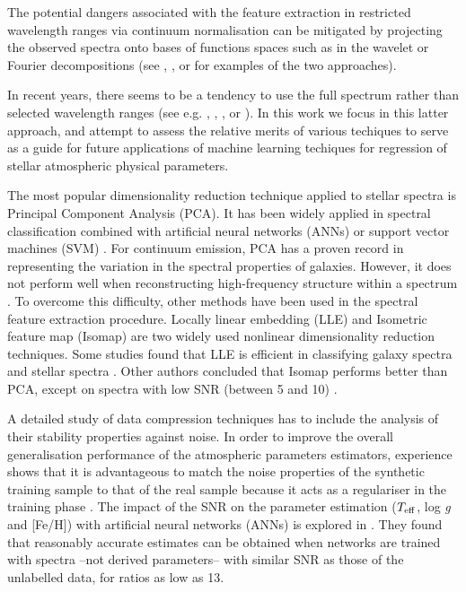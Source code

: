 \documentclass[a4paper,fleqn,usenatbib]{mnras}
\begin{document}
The potential dangers associated with the feature extraction in
restricted wavelength ranges via continuum normalisation can be
mitigated by projecting the observed spectra onto bases of functions
spaces such as in the wavelet or Fourier decompositions (see
\cite{2010PASP..122..608M}, \cite{2015MNRAS.452.1394L}, or
\cite{2015ApJS..218....3L} for examples of the two approaches).

In recent years, there seems to be a tendency to use the full spectrum
rather than selected wavelength ranges (see
e.g. \cite{2014A&A...567A...5R}, \cite{2015ApJ...808...16N},
\cite{2015MNRAS.448.2717W}, or \cite{2015arXiv151000111R}). In this
work we focus in this latter approach, and attempt to assess the
relative merits of various techiques to serve as a guide for future
applications of machine learning techiques for regression of stellar
atmospheric physical parameters.

The most popular dimensionality reduction technique applied to stellar
spectra is Principal Component Analysis (PCA). It has been widely
applied in spectral classification combined with artificial neural
networks (ANNs) \citep{singh:98} or support vector machines (SVM)
\citep{fiorentin:08b}. For continuum emission, PCA has a proven record
in representing the variation in the spectral properties of
galaxies. However, it does not perform well when reconstructing
high-frequency structure within a spectrum \citep{vanderplas:09}. To
overcome this difficulty, other methods have been used in the spectral
feature extraction procedure. Locally linear embedding (LLE)
\citep{roweisLLE:00} and Isometric feature map (Isomap)
\citep{tenenbaum:00} are two widely used nonlinear dimensionality
reduction techniques. Some studies found that LLE is efficient in
classifying galaxy spectra \citep{vanderplas:09} and stellar spectra
\citep{daniel:11}. Other authors concluded that Isomap performs better
than PCA, except on spectra with low SNR (between 5 and 10)
\citep{bu:14}.

A detailed study of data compression techniques has to include the
analysis of their stability properties against noise. In order to
improve the overall generalisation performance of the atmospheric
parameters estimators, experience shows that it is advantageous to
match the noise properties of the synthetic training sample to that of
the real sample because it acts as a regulariser in the training phase
\citep{fiorentin:08a}.  The impact of the SNR on the parameter
estimation ($T_{\rm eff}$, log \textit{g} and [Fe/H]) with artificial
neural networks (ANNs) is explored in \cite{snider:01}. They found
that reasonably accurate estimates can be obtained when networks are
trained with spectra --not derived parameters-- with similar SNR as
those of the unlabelled data, for ratios as low as 13.
\end{document}
